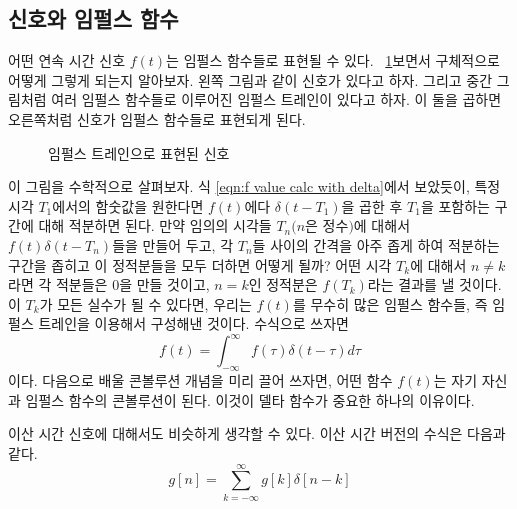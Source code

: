 \subsection{신호와 임펄스 함수}
어떤 연속 시간 신호 $f(t)$는 임펄스 함수들로 표현될 수 있다. \figurename~\ref{fig:sig by impulses}\을 보면서 구체적으로 어떻게 그렇게 되는지 알아보자.
왼쪽 그림과 같이 신호가 있다고 하자. 그리고 중간 그림처럼 여러 임펄스 함수들로 이루어진 임펄스 트레인이 있다고 하자.
이 둘을 곱하면 오른쪽처럼 신호가 임펄스 함수들로 표현되게 된다.
\begin{figure}
    \centering
    \caption{임펄스 트레인으로 표현된 신호}\label{fig:sig by impulses}
\end{figure}
이 그림을 수학적으로 살펴보자.
식 \ref{eqn:f value calc with delta}에서 보았듯이, 특정 시각 $T_1$에서의 함숫값을 원한다면 $f(t)$에다 $\delta(t-T_1)$을 곱한 후 $T_1$을 포함하는 구간에 대해 적분하면 된다.
만약 임의의 시각들 $T_n\text{(}n\text{은 정수)}$에 대해서 $f(t)\delta(t-T_n)$들을 만들어 두고, 각 $T_n$들 사이의 간격을 아주 좁게 하여 적분하는 구간을 좁히고 이 정적분들을 모두 더하면 어떻게 될까?
어떤 시각 $T_k$에 대해서 $n\neq k$라면 각 적분들은 $0$을 만들 것이고, $n=k$인 정적분은 $f(T_k)$라는 결과를 낼 것이다.
이 $T_k$가 모든 실수가 될 수 있다면, 우리는 $f(t)$를 무수히 많은 임펄스 함수들, 즉 임펄스 트레인을 이용해서 구성해낸 것이다.
수식으로 쓰자면
\begin{equation}
    f(t)=\int_{-\infty}^{\infty}f(\tau)\delta(t-\tau)d\tau \label{eqn:f by impulse train}
\end{equation}
이다. 다음으로 배울 콘볼루션 개념을 미리 끌어 쓰자면, 어떤 함수 $f(t)$는 자기 자신과 임펄스 함수의 콘볼루션이 된다. 이것이 델타 함수가 중요한 하나의 이유이다.
\par
이산 시간 신호에 대해서도 비슷하게 생각할 수 있다. 이산 시간 버전의 수식은 다음과 같다.
\begin{equation}
    g[n]=\sum _{k=-\infty}^{\infty}g[k]\delta[n-k]
\end{equation}


